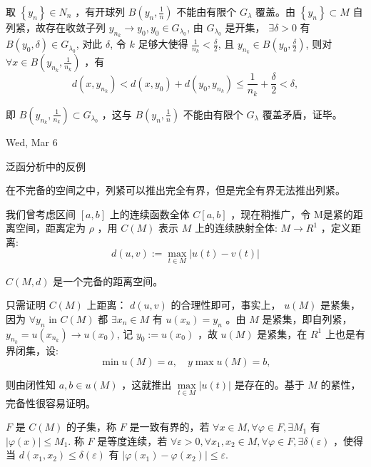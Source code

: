 \begin{solution}
    取 $\left\{y_n\right\} \in N_n$ ，有开球列 $B\left(y_n, \frac{1}{n}\right)$ 不能由有限个 $G_\lambda$ 覆盖。由 $\left\{y_n\right\} \subset M$ 自列紧，故存在收敛子列 $y_{n_k} \rightarrow y_0, y_0 \in G_{\lambda_0}$, 由 $G_{\lambda_0}$ 是开集， $\exists \delta>0$ 有 $B\left(y_0, \delta\right) \in G_{\lambda_0}$, 对此 $\delta$, 令 $k$ 足够大使得 $\frac{1}{n_k}<\frac{\delta}{2}$, 且 $y_{n_k} \in B\left(y_0, \frac{\delta}{2}\right)$, 则对 $\forall x \in B\left(y_{n_k}, \frac{1}{n_k}\right)$ ，有
    $$
    d\left(x, y_{n_k}\right)<d\left(x, y_0\right)+d\left(y_0, y_{n_k}\right) \leq \frac{1}{n_k}+\frac{\delta}{2}<\delta,
    $$

    即 $B\left(y_{n_k}, \frac{1}{n_k}\right) \subset G_{\lambda_0}$ ，这与 $B\left(y_n, \frac{1}{n}\right)$ 不能由有限个 $G_\lambda$ 覆盖矛盾，证毕。
\end{solution}
\begin{center}
    Wed, Mar 6
\end{center}
\begin{center}
    泛函分析中的反例
\end{center}
\begin{remark}
    在不完备的空间之中，列紧可以推出完全有界，但是完全有界无法推出列紧。
\end{remark}

我们曾考虑区间 $[a, b]$ 上的连续函数全体 $C[a, b]$ ，现在稍推广，令 $\mathrm{M}$是紧的距离空间，距离定为 $\rho$ ，用 $C(M)$ 表示 $M$ 上的连续胦射全体: $M \rightarrow R^1$ ，定义距离:
$$
d(u, v):=\max\limits_{t \in M}|u(t)-v(t)|
$$

\begin{proposition}
    $C(M, d)$ 是一个完备的距离空间。
\end{proposition}
\begin{solution}
    只需证明 $C(M)$ 上距离： $d(u, v)$ 的合理性即可，事实上， $u(M)$ 是紧集，因为 $\forall y_n$ in $C(M)$ 都 $\exists x_n \in M$ 有 $u\left(x_n\right)=y_n$ 。由 $M$ 是紧集，即自列紧，
    $y_{n_k}=u\left(x_{n_k}\right) \rightarrow u\left(x_0\right)$, 记 $y_0:=u\left(x_0\right)$ ，故 $u(M)$ 是紧集，在 $R^1$ 上也是有界闭集，设:
    $$
        \min u(M)=a, \quad y\max u(M)=b,
    $$

    则由闭性知 $a, b \in u(M)$ ，这就推出 $\max\limits_{t \in M}|u(t)|$ 是存在的。基于 $M$ 的紧性，完备性很容易证明。
\end{solution}

\begin{definition}[一致有界与等度连续]
    $F$ 是 $C(M)$ 的子集，称 $F$ 是一致有界的，若 $\forall x \in M, \forall \varphi \in F, \exists M_1$ 有 $|\varphi(x)| \leq M_1$.
称 $F$ 是等度连续，若 $\forall \varepsilon>0, \forall x_1, x_2 \in M, \forall \varphi \in F, \exists \delta(\varepsilon)$ ，使得当 $d\left(x_1, x_2\right) \leq \delta(\varepsilon)$ 有 $\left|\varphi\left(x_1\right)-\varphi\left(x_2\right)\right| \leq \varepsilon$.
\end{definition}

